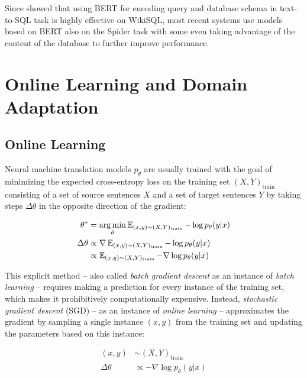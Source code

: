 Since \textcite{hwang-2019} showed that using BERT \parencite{devlin-2019} for
encoding query and database schema in text-to-SQL task is highly effective on
WikiSQL, most recent systems use models based on BERT also on the Spider task
\parencites{shaw-2020}{wang-2020}{lin-2020} with some even taking advantage of
the content of the database \parencites{wang-2020}{lin-2020} to further improve
performance.

\section{Online Learning and Domain Adaptation}

\subsection{Online Learning}

Neural machine translation models \(p_{\theta}\) are usually
\parencite[376]{stahlberg-2020} trained with the goal of minimizing the expected
cross-entropy loss on the training set \((X, Y)_{\text{train}}\) consisting of a
set of source sentences \(X\) and a set of target sentences \(Y\) by taking
steps \(\Delta \theta\) in the opposite direction of the gradient:

\begin{align}
  \theta^* &= \operatorname*{arg\,min}_{\theta} \operatorname{\mathbb{E}}_{(x, y) \sim (X, Y)_{\text{train}}} -\log p_{\theta}(y|x)\\
  \Delta \theta &\propto \nabla \operatorname{\mathbb{E}}_{(x, y) \sim (X, Y)_{\text{train}}} -\log p_{\theta}(y|x)\\
  &\propto \operatorname{\mathbb{E}}_{(x, y) \sim (X, Y)_{\text{train}}} -\nabla \log p_{\theta}(y|x)
\end{align}

This explicit method – also called \emph{batch gradient descent} as an instance
of \emph{batch learning} \parencites[275]{goodfellow-2016}[100]{murphy-2021} –
requires making a prediction for every instance of the training set, which makes
it prohibitively computationally expensive. Instead, \emph{stochastic gradient
  descent} (SGD) – as an instance of \emph{online learning}
\parencites[275]{goodfellow-2016}[100]{murphy-2021} – approximates the gradient
by sampling a single instance \((x,y)\) from the training set and updating the
parameters based on this instance:

\begin{align}
  (x,y) &\sim (X,Y)_{\text{train}}\\
  \Delta \theta &\propto -\nabla \log p_{\theta}(y|x)\\
\end{align}

